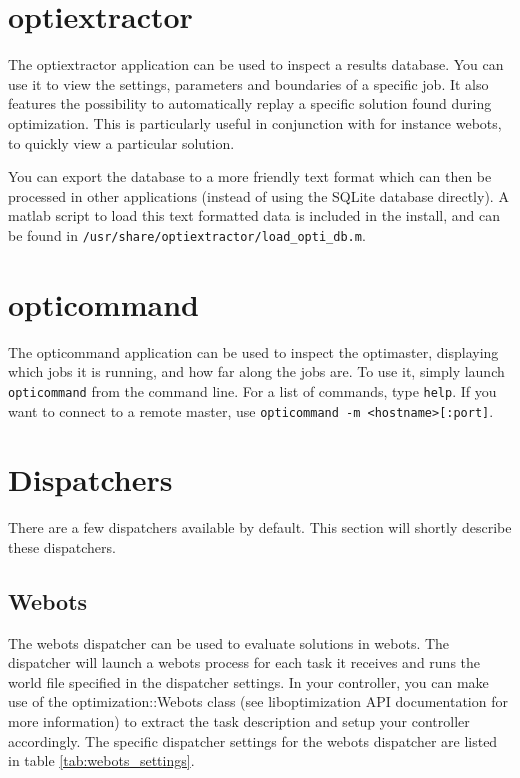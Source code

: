 \documentclass{report}
\begin{document}
\section{optiextractor}\label{app:optiextractor}
The optiextractor application can be used to inspect a results database. You
can use it to view the settings, parameters and boundaries of a specific
job. It also features the possibility to automatically replay a specific
solution found during optimization. This is particularly useful in conjunction
with for instance webots, to quickly view a particular solution.

You can export the database to a more friendly text format which can then be
processed in other applications (instead of using the SQLite database directly).
A matlab script to load this text formatted data is included in the install,
and can be found in \verb!/usr/share/optiextractor/load_opti_db.m!.

\section{opticommand}\label{app:opticommand}
The opticommand application can be used to inspect the optimaster, displaying
which jobs it is running, and how far along the jobs are. To use it, simply
launch \verb!opticommand! from the command line. For a list of commands, type
\verb!help!. If you want to connect to a remote master, use
\verb!opticommand -m <hostname>[:port]!.

\section{Dispatchers}
There are a few dispatchers available by default. This section will shortly
describe these dispatchers.

\subsection{Webots}
The webots dispatcher can be used to evaluate solutions in webots. The
dispatcher will launch a webots process for each task it receives and runs
the world file specified in the dispatcher settings. In your controller, you
can make use of the optimization::Webots class (see liboptimization API
documentation for more information) to extract the task description and setup
your controller accordingly. The specific dispatcher settings for the webots
dispatcher are listed in table \ref{tab:webots_settings}.
\end{document}
